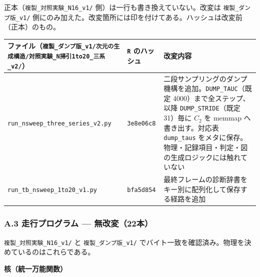 \documentclass[
  10pt,
]{ltjsarticle}
\newcounter{none} %
\begin{document}
正本（\texttt{複製\_対照実験\_N16\_v1/}
側）は一行も書き換えていない。改変は \texttt{複製\_ダンプ版\_v1/}
側にのみ加えた。改変箇所には印を付けてある。ハッシュは改変前（正本）のもの。

{\def\LTcaptype{none} %
\begin{longtable}[]{@{}
  >{\raggedright\arraybackslash}p{}
  >{\raggedright\arraybackslash}p{}
  >{\raggedright\arraybackslash}p{}@{}}
\toprule\noalign{}
\begin{minipage}[b]{\linewidth}\raggedright
ファイル（\texttt{複製\_ダンプ版\_v1/次元の生成構造/対照実験\_N掃引1to20\_三系\_v2/}）
\end{minipage} & \begin{minipage}[b]{\linewidth}\raggedright
\texttt{R} のハッシュ
\end{minipage} & \begin{minipage}[b]{\linewidth}\raggedright
改変内容
\end{minipage} \\
\midrule\noalign{}
\endhead
\bottomrule\noalign{}
\endlastfoot
\texttt{run\_nsweep\_three\_series\_v2.py} & \texttt{3e8e06c8} &
二段サンプリングのダンプ機構を追加。\texttt{DUMP\_TAUC}（既定
4000）まで全ステップ、以降 \texttt{DUMP\_STRIDE}（既定 31）毎に \(C_2\)
を memmap へ書き出す。対応表 \texttt{dump\_taus}
をメタに保存。物理・記録項目・判定・図の生成ロジックには触れていない \\
\texttt{run\_tb\_nsweep\_1to20\_v1.py} & \texttt{bfa5d854} &
最終フレームの診断辞書をキー別に配列化して保存する経路を追加 \\
\end{longtable}
}

\subsubsection{A.3 走行プログラム ---
無改変（22本）}\label{a.3-ux8d70ux884cux30d7ux30edux30b0ux30e9ux30e0-ux7121ux6539ux590922ux672c}

\texttt{複製\_対照実験\_N16\_v1/} と \texttt{複製\_ダンプ版\_v1/}
でバイト一致を確認済み。物理を決めているのはこれらである。

\textbf{核（統一万能関数）}
\end{document}
